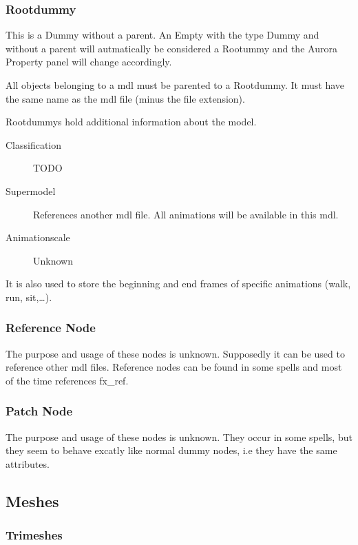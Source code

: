 \subsubsection{Rootdummy}
This is a Dummy without a parent. An Empty with the type Dummy and without
a parent will autmatically be considered a Rootummy and the Aurora Property
panel will change accordingly.

All objects belonging to a mdl must be parented to a Rootdummy. It must have
the same name as the mdl file (minus the file extension).

Rootdummys hold additional information about the model.
\begin{description}
    \item[Classification] TODO
    \item[Supermodel] References another mdl file. All animations will be available in this mdl.
    \item[Animationscale] Unknown
\end{description}
It is also used to store the beginning and end frames of specific animations
(walk, run, sit,\ldots).

\subsubsection{Reference Node}
The purpose and usage of these nodes is unknown. Supposedly it can be used to
reference other mdl files. Reference nodes can be found in some spells and
most of the time references fx\_ref.

\subsubsection{Patch Node}
The purpose and usage of these nodes is unknown. They occur in some spells, but
they seem to behave excatly like normal dummy nodes, i.e they have the same
attributes.

\subsection{Meshes}

\subsubsection{Trimeshes}

